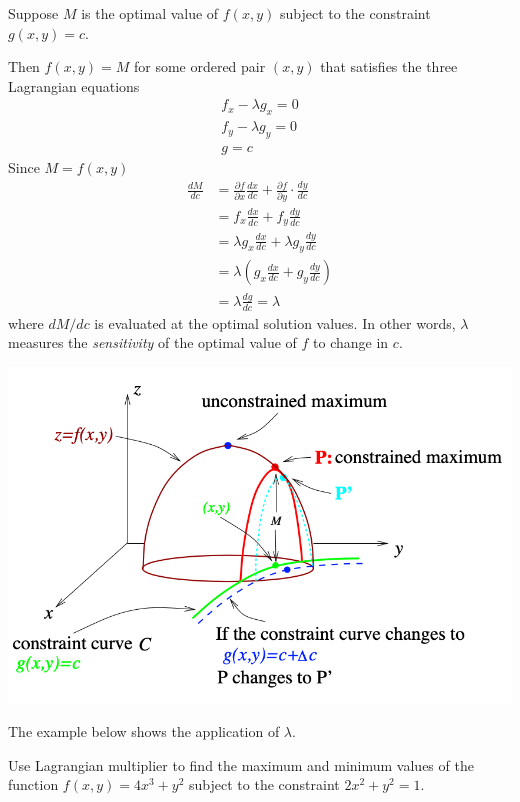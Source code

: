 \begin{spacing}{1.3}
    Suppose $M$ is the optimal value of $f(x, y)$ subject to the constraint $g(x, y)=c.$

    Then $f(x, y)=M$ for some ordered pair $(x, y)$ that satisfies the three Lagrangian equations
    $$\begin{array}{r}
        f_{x}-\lambda g_{x}=0 \\
        f_{y}-\lambda g_{y}=0 \\
        g=c
    \end{array}$$
    Since $M=f(x, y)$
    $$\begin{aligned}
    \frac{d M}{d c} &=\frac{\partial f}{\partial x} \frac{d x}{d c}+\frac{\partial f}{\partial y} \cdot \frac{d y}{d c} \\
    &=f_{x} \frac{d x}{d c}+f_{y} \frac{d y}{d c} \\
    &=\lambda g_{x} \frac{d x}{d c}+\lambda g_{y} \frac{d y}{d c} \\
    &=\lambda\left(g_{x} \frac{d x}{d c}+g_{y} \frac{d y}{d c}\right) \\
    &=\lambda \frac{d g}{d c}=\lambda
    \end{aligned}$$
    where $d M / d c$ is evaluated at the optimal solution values. In other words, $\lambda$ measures 
    the {\it sensitivity} of the optimal value of $f$ to change in $c$.
    \begin{center}
        \includegraphics[scale=0.53]{images/Ch13-intepret-lambda.png}
    \end{center}

    \newpage
    {\blue The example below shows the application of $\lambda$.}
    
    \eg Use Lagrangian multiplier to find the maximum and minimum values of the function
    $f(x, y)=4 x^{3}+y^{2}$
    subject to the constraint $2x^{2}+y^{2}=1$.


\end{spacing}
